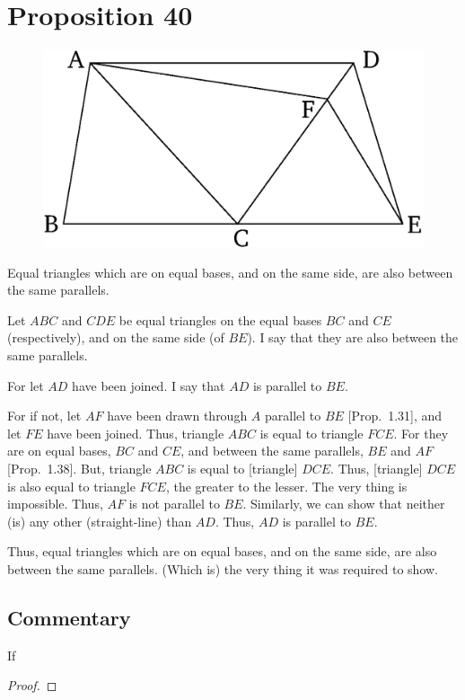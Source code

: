\chapter*{Proposition 40}



\begin{figure}[ht]
    \begin{center}
    \includegraphics[width=0.5\linewidth]{figures/fig40e.eps}
    \label{fig:prop_40}
    \end{center}
\end{figure}

Equal triangles which are on equal bases, and on the same side, are also
between the same parallels.

Let $ABC$ and $CDE$ be equal triangles on the equal bases $BC$ and $CE$ (respectively), and on the same side (of $BE$). I say that they are also between
the same parallels.

For let $AD$ have been joined. I say that $AD$ is parallel to $BE$.

For if not, let $AF$ have been drawn through $A$ parallel to $BE$ [Prop.~1.31],
and let $FE$ have been joined. Thus, triangle $ABC$ is equal to triangle
$FCE$. For they are on equal bases, $BC$ and $CE$, and between the same
parallels, $BE$ and $AF$ [Prop.~1.38]. But, triangle $ABC$ is equal to [triangle] $DCE$.
Thus, [triangle] $DCE$ is also equal to triangle $FCE$, the greater to the
lesser. The very thing is impossible. 
Thus, $AF$ is not parallel to $BE$. Similarly, we can show that neither (is)
any other (straight-line) than $AD$. Thus, $AD$ is parallel to $BE$.

Thus, equal triangles which are on equal bases, and on the same side, are also
between the same parallels. (Which is) the very thing it was required to show.


\section*{Commentary}

\begin{proposition}\label{proposition_40}\leanok
    If
\end{proposition}
\begin{proof}
    \leanok
\end{proof}
